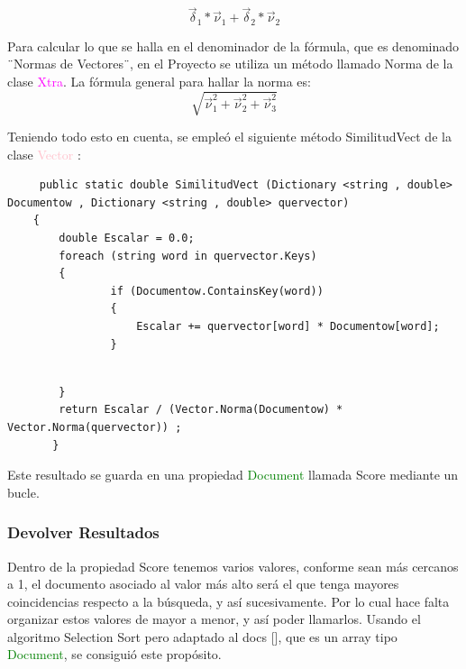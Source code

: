 \documentclass{beamer}
\begin{document}
\begin{equation}
\vec{\delta}_{1} * \vec{\nu}_{1} + \vec{\delta}_{2} * \vec{\nu}_{2}  
\end{equation}    

Para calcular lo que se halla en el denominador de la fórmula, que es denominado ¨Normas de Vectores¨, en el Proyecto se utiliza un método llamado Norma de la clase \textcolor{magenta}{Xtra}. La fórmula general para hallar la norma es:
\begin{equation}
    \sqrt{\vec{\nu}_{1}^2 + \vec{\nu}_{2}^2 + \vec{\nu}_{3}^2 } 
\end{equation}

\begin{frame}[fragile]
Teniendo todo esto en cuenta, se empleó el siguiente método SimilitudVect de la clase \textcolor{pink}{Vector} :
\begin{lstlisting}
     public static double SimilitudVect (Dictionary <string , double> Documentow , Dictionary <string , double> quervector)
    {
        double Escalar = 0.0;
        foreach (string word in quervector.Keys)
        {
                if (Documentow.ContainsKey(word))
                {
                    Escalar += quervector[word] * Documentow[word];
                }
       

\end{lstlisting}

\end{frame}    


\begin{frame}[fragile]

       \begin{lstlisting}  
        }
        return Escalar / (Vector.Norma(Documentow) * Vector.Norma(quervector)) ;
       }
        \end{lstlisting}


Este resultado se guarda en una propiedad \textcolor{green}{Document} llamada Score mediante un bucle.

        
    \end{frame}

\begin{frame}[fragile]
    \frametitle{Devolver Resultados}
\Large Dentro de la propiedad Score tenemos varios valores, conforme sean más cercanos a 1, el documento asociado al valor más alto será el que tenga mayores coincidencias respecto a la búsqueda, y así sucesivamente. Por lo cual hace falta organizar estos valores de mayor a menor, y así poder llamarlos.
Usando el algoritmo Selection Sort pero adaptado al docs [], que es un array tipo \textcolor{green}{Document}, se consiguió este propósito.

\end{frame}
\end{document}
